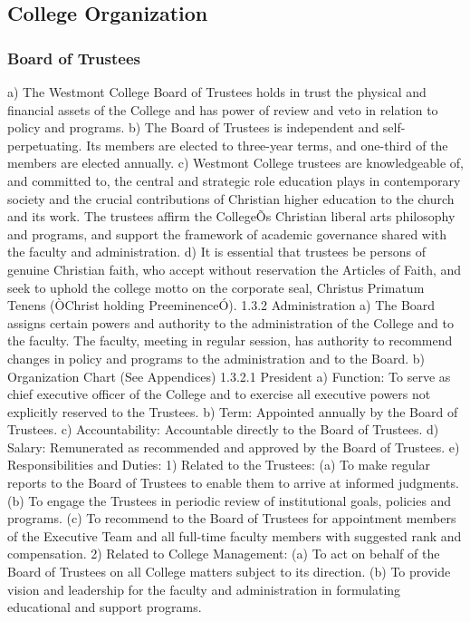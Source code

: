 \documentclass[letterpaper, 11pt]{article}
\begin{document}
\subsection{College Organization}
\subsubsection{Board of Trustees}
a) The Westmont College Board of Trustees holds in trust the physical and financial assets of the College and has power of review and veto in relation to policy and programs.
b) The Board of Trustees is independent and self-perpetuating. Its members are elected to three-year terms, and one-third of the members are elected annually.
c) Westmont College trustees are knowledgeable of, and committed to, the central and strategic role education plays in contemporary society and the crucial contributions of Christian higher education to the church and its work. The trustees affirm the CollegeÕs Christian liberal arts philosophy and programs, and support the framework of academic governance shared with the faculty and administration.
d) It is essential that trustees be persons of genuine Christian faith, who accept without reservation the Articles of Faith, and seek to uphold the college motto on the corporate seal, Christus Primatum Tenens (ÒChrist holding PreeminenceÓ).
1.3.2 Administration
a) The Board assigns certain powers and authority to the administration of the College and to the faculty. The faculty, meeting in regular session, has authority to recommend changes in policy and programs to the administration and to the Board.
b) Organization Chart (See Appendices)
1.3.2.1 President
a) Function: To serve as chief executive officer of the College and to exercise all executive powers not explicitly reserved to the Trustees.
b) Term: Appointed annually by the Board of Trustees.
c) Accountability: Accountable directly to the Board of Trustees.
d) Salary: Remunerated as recommended and approved by the Board of Trustees.
e) Responsibilities and Duties:
1) Related to the Trustees:
(a) To make regular reports to the Board of Trustees to enable them to arrive at informed judgments.
(b) To engage the Trustees in periodic review of institutional goals, policies and programs.
(c) To recommend to the Board of Trustees for appointment members of the Executive Team and all full-time faculty members with suggested rank and compensation.
2) Related to College Management:
(a) To act on behalf of the Board of Trustees on all College matters subject to its direction.
(b) To provide vision and leadership for the faculty and administration in formulating educational and support programs.
\end{document}
